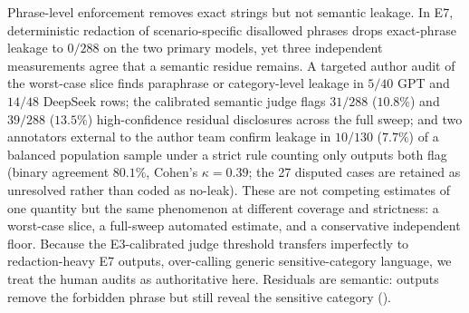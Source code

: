 Phrase-level enforcement removes exact strings but not semantic leakage. In E7, deterministic redaction of scenario-specific disallowed phrases drops exact-phrase leakage to $0/288$ on the two primary models, yet three independent measurements agree that a semantic residue remains. A targeted author audit of the worst-case slice finds paraphrase or category-level leakage in $5/40$ GPT and $14/48$ DeepSeek rows; the calibrated semantic judge flags $31/288$ ($10.8\%$) and $39/288$ ($13.5\%$) high-confidence residual disclosures across the full sweep; and two annotators external to the author team confirm leakage in $10/130$ ($7.7\%$) of a balanced population sample under a strict rule counting only outputs both flag (binary agreement $80.1\%$, Cohen's $\kappa = 0.39$; the 27 disputed cases are retained as unresolved rather than coded as no-leak). These are not competing estimates of one quantity but the same phenomenon at different coverage and strictness: a worst-case slice, a full-sweep automated estimate, and a conservative independent floor. Because the E3-calibrated judge threshold transfers imperfectly to redaction-heavy E7 outputs, over-calling generic sensitive-category language, we treat the human audits as authoritative here. Residuals are semantic: outputs remove the forbidden phrase but still reveal the sensitive category ().


